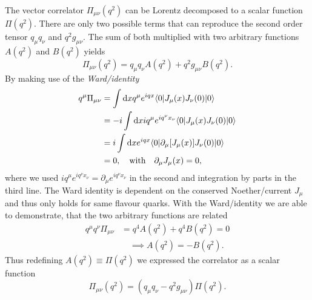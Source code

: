 \documentclass[../../index.tex]{subfiles}
\begin{document}
The vector correlator $\Pi_{\mu\nu}(q^2)$ can be Lorentz decomposed to a scalar
function $\Pi(q^2)$. There are only two possible terms that can reproduce the
second order tensor $q_\mu q_\nu$ and $q^2 g_{\mu\nu}$. The sum of both
multiplied with two arbitrary functions $A(q^2)$ and $B(q^2)$ yields
\begin{equation}
  \Pi_{\mu\nu}(q^2) = q_\mu q_\nu A(q^2) + q^2 g_{\mu\nu} B(q^2).
\end{equation}
By making use of the \textit{Ward\-/identity}
\begin{equation}
  \label{eq:wardIdentity}
  \begin{split}
    q^\mu \Pi_{\mu\nu} &= \int \dif x q^\mu e^{iqx} \langle 0 \vert  J_\mu(x) J_\nu(0) \vert 0 \rangle \\
    &= -i \int \dif x i q^\mu e^{i q^\nu x_\nu} \langle 0 \vert J_\mu(x) J_\nu(0) \vert 0 \rangle \\
    &= i \int \dif x  e^{iqx} \langle 0 \vert \partial_\mu[J_\mu(x)] J_\nu(0)
    \vert 0 \rangle \\
    &= 0, \quad \text{with}  \quad \partial_\mu J_\mu(x) = 0,
  \end{split}
\end{equation}
where we used $i q^\mu e^{i q^\nu x_\nu} = \partial_\mu e^{i q^\nu x_\nu}$ in
the second and integration by parts in the third line. The Ward identity is
dependent on the conserved Noether\-/current $J_\mu$ and thus only holds for
same flavour quarks. With the Ward\-/identity we are able to demonstrate, that
the two arbitrary functions are related
\begin{equation}
  \begin{split}
    q^\mu q^\nu \Pi_{\mu\nu} &= q^4 A(q^2) + q^4 B(q^2) = 0 \\
    &\quad \implies A(q^2) = -B(q^2).
  \end{split}
\end{equation}
Thus redefining $A(q^2) \equiv \Pi(q^2)$ we expressed the correlator as a scalar
function
\begin{equation}
  \Pi_{\mu\nu}(q^2) = (q_\mu q_\nu - q^2 g_{\mu\nu})\Pi(q^2).
\end{equation}
\end{document}
